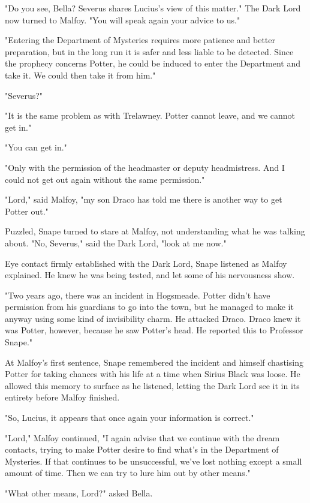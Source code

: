 \documentclass[a4paper,11pt]{article}
\begin{document}
"Do you see, Bella? Severus shares Lucius's view of this matter." The Dark Lord now turned to Malfoy. "You will speak again your advice to us."

"Entering the Department of Mysteries requires more patience and better preparation, but in the long run it is safer and less liable to be detected. Since the prophecy concerns Potter, he could be induced to enter the Department and take it. We could then take it from him."

"Severus?"

"It is the same problem as with Trelawney. Potter cannot leave, and we cannot get in."

"You can get in."

"Only with the permission of the headmaster or deputy headmistress. And I could not get out again without the same permission."

"Lord," said Malfoy, "my son Draco has told me there is another way to get Potter out."

Puzzled, Snape turned to stare at Malfoy, not understanding what he was talking about. "No, Severus," said the Dark Lord, "look at me now."

Eye contact firmly established with the Dark Lord, Snape listened as Malfoy explained. He knew he was being tested, and let some of his nervousness show.

"Two years ago, there was an incident in Hogsmeade. Potter didn't have permission from his guardians to go into the town, but he managed to make it anyway using some kind of invisibility charm. He attacked Draco. Draco knew it was Potter, however, because he saw Potter's head. He reported this to Professor Snape."

At Malfoy's first sentence, Snape remembered the incident and himself chastising Potter for taking chances with his life at a time when Sirius Black was loose. He allowed this memory to surface as he listened, letting the Dark Lord see it in its entirety before Malfoy finished.

"So, Lucius, it appears that once again your information is correct."

"Lord," Malfoy continued, "I again advise that we continue with the dream contacts, trying to make Potter desire to find what's in the Department of Mysteries. If that continues to be unsuccessful, we've lost nothing except a small amount of time. Then we can try to lure him out by other means."

"What other means, Lord?" asked Bella.
\end{document}
